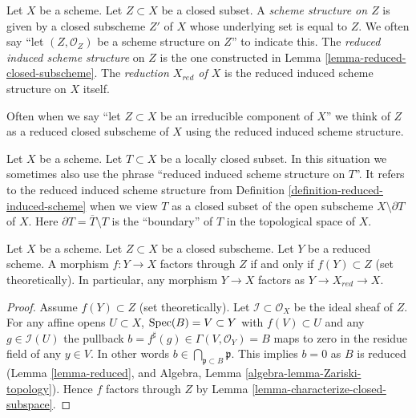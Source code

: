 \begin{definition}
\label{definition-reduced-induced-scheme}
Let $X$ be a scheme. Let $Z \subset X$ be a closed subset.
A {\it scheme structure on $Z$} is given by a closed subscheme $Z'$ of
$X$ whose underlying set is equal to $Z$. We often say
``let $(Z, \mathcal{O}_Z)$ be a scheme structure on $Z$'' to
indicate this. The {\it reduced induced scheme structure}
on $Z$ is the one constructed in Lemma \ref{lemma-reduced-closed-subscheme}.
The {\it reduction $X_{red}$ of $X$} is the reduced induced scheme
structure on $X$ itself.
\end{definition}

\noindent
Often when we say ``let $Z \subset X$ be an irreducible component of $X$''
we think of $Z$ as a reduced closed subscheme of $X$ using the reduced induced
scheme structure.

\begin{remark}
\label{remark-reduced-induced-locally-closed}
Let $X$ be a scheme. Let $T \subset X$ be a locally closed subset.
In this situation we sometimes also use the phrase
``reduced induced scheme structure on $T$''. It refers
to the reduced induced scheme structure from
Definition \ref{definition-reduced-induced-scheme}
when we view $T$ as a closed subset of the open subscheme 
$X \setminus \partial T$ of $X$. Here
$\partial T = \overline{T} \setminus T$ is the ``boundary'' of $T$
in the topological space of $X$.
\end{remark}

\begin{lemma}
\label{lemma-map-into-reduction}
Let $X$ be a scheme.
Let $Z \subset X$ be a closed subscheme.
Let $Y$ be a reduced scheme.
A morphism $f : Y \to X$ factors through $Z$ if and only if
$f(Y) \subset Z$ (set theoretically). In particular, any
morphism $Y \to X$ factors as $Y \to X_{red} \to X$.
\end{lemma}

\begin{proof}
Assume $f(Y) \subset Z$ (set theoretically).
Let $\mathcal{I} \subset \mathcal{O}_X$ be the ideal sheaf of $Z$.
For any affine opens $U \subset X$, $\mathop{\mathrm{Spec}}(B) = V \subset Y$
with $f(V) \subset U$ and any $g \in \mathcal{I}(U)$
the pullback $b = f^\sharp(g) \in \Gamma(V, \mathcal{O}_Y) = B$
maps to zero in the residue field of any $y \in V$.
In other words $b \in \bigcap_{\mathfrak p \subset B} \mathfrak p$.
This implies $b = 0$ as $B$ is reduced (Lemma \ref{lemma-reduced}, and
Algebra, Lemma \ref{algebra-lemma-Zariski-topology}).
Hence $f$ factors through
$Z$ by Lemma \ref{lemma-characterize-closed-subspace}.
\end{proof}










